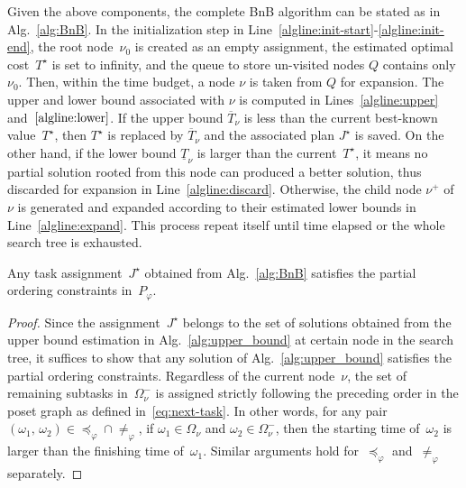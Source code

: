Given the above components, the complete BnB algorithm can be stated as
in Alg.~\ref{alg:BnB}.
In the initialization step in
Line~\ref{algline:init-start}-\ref{algline:init-end},
the root node~$\nu_0$ is created as an empty assignment,
the estimated optimal cost~$T^{\star}$ is set to infinity,
and the queue to store un-visited nodes $Q$ contains only $\nu_0$.
Then, within the time budget, a node $\nu$ is taken from $Q$ for expansion.
The upper and lower bound associated with $\nu$ is computed in
Lines~\ref{algline:upper} and~$\ref{algline:lower}$.
If the upper bound $\overline{T}_{\nu}$ is less than the current best-known
value~$T^{\star}$, then $T^{\star}$ is replaced by $\overline{T}_{\nu}$ and the
associated plan $J^\star$ is saved.
On the other hand, if the lower bound $\underline{T}_{\nu}$ is larger than
the current~$T^\star$, it means no partial solution rooted from this node
can produced a better solution, thus discarded for expansion
in Line~\ref{algline:discard}.
Otherwise, the child node $\nu^+$ of $\nu$ is generated and expanded
according to their estimated lower bounds in Line~\ref{algline:expand}.
This process repeat itself until time elapsed or the whole search tree is
exhausted.

\begin{lemma}\label{lemma:BnB-satisfying}
Any task assignment~$J^\star$ obtained from Alg.~\ref{alg:BnB} satisfies
the partial ordering constraints in~$P_{\varphi}$.
\end{lemma}
\begin{proof}
Since the assignment~$J^\star$ belongs to the set of solutions obtained from
the upper bound estimation in Alg.~\ref{alg:upper_bound}
at certain node in the search tree, it suffices to show that any solution
of Alg.~\ref{alg:upper_bound} satisfies the partial ordering constraints.
Regardless of the current node~$\nu$, the set of remaining subtasks
in~$\Omega^-_\nu$ is assigned strictly following the preceding order
in the poset graph as defined in~\eqref{eq:next-task}.
In other words, for any pair~$(\omega_1,\,\omega_2)\in \preceq_{\varphi}\cap \neq_{\varphi}$,
if $\omega_1\in \Omega_\nu$ and $\omega_2\in \Omega^-_\nu$,
then the starting time of~$\omega_2$ is larger than the finishing time of~$\omega_1$.
Similar arguments hold for~$\preceq_{\varphi}$ and~$\neq_{\varphi}$ separately.
\end{proof}
